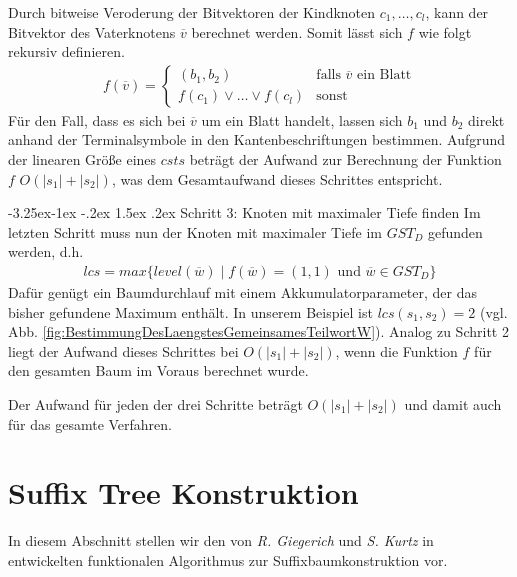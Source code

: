 \documentclass[12pt]{report}
\makeatletter
\renewcommand\paragraph{\@startsection{paragraph}{4}{\z@}%
    {-3.25ex\@plus -1ex \@minus -.2ex}%
    {1.5ex \@plus .2ex}%
    {\normalfont\normalsize\bfseries}}
\newcommand{\abs}[1]{\left|#1\right|}
\makeatother
\begin{document}
Durch bitweise Veroderung der Bitvektoren der Kindknoten $c_1, \dots, c_l$, kann der Bitvektor des Vaterknotens $\overline{v}$ berechnet werden. Somit lässt sich $f$ wie folgt rekursiv definieren.
\begin{gather*}
    f(\overline{v}) = \begin{cases}
        (b_1, b_2)                    &\text{falls } \overline{v} \text{ ein Blatt} \\
        f(c_1) \vee \dots \vee f(c_l) &\text{sonst}
    \end{cases}
\end{gather*}
Für den Fall, dass es sich bei $\overline{v}$ um ein Blatt handelt, lassen sich $b_1$ und $b_2$ direkt anhand der Terminalsymbole in den Kantenbeschriftungen bestimmen. Aufgrund der linearen Größe eines $csts$ beträgt der Aufwand zur Berechnung der Funktion $f$ $O(\abs{s_1} + \abs{s_2})$, was dem Gesamtaufwand dieses Schrittes entspricht.

\paragraph{Schritt 3: Knoten mit maximaler Tiefe finden}
Im letzten Schritt muss nun der Knoten mit maximaler Tiefe im $GST_D$ gefunden werden, d.h.
\begin{gather*}
   lcs = max \{level(\overline{w}) \mid f(\overline{w}) = (1, 1) \text{ und } \overline{w} \in GST_D\}
\end{gather*}
Dafür genügt ein Baumdurchlauf mit einem Akkumulatorparameter, der das bisher gefundene Maximum enthält. In unserem Beispiel ist $lcs(s_1, s_2) = 2$ (vgl. Abb. \ref{fig:BestimmungDesLaengstesGemeinsamesTeilwortW}). Analog zu Schritt 2 liegt der Aufwand dieses Schrittes bei $O(\abs{s_1} + \abs{s_2})$, wenn die Funktion $f$ für den gesamten Baum im Voraus berechnet wurde.

Der Aufwand für jeden der drei Schritte beträgt $O(\abs{s_1} + \abs{s_2})$ und damit auch für das gesamte Verfahren.

\section{Suffix Tree Konstruktion}
\label{sec:SuffixTreeKonstruktion}

In diesem Abschnitt stellen wir den von \textit{R. Giegerich} und \textit{S. Kurtz} in \cite{Giegerich1995} entwickelten funktionalen Algorithmus zur Suffixbaumkonstruktion vor.
\end{document}
